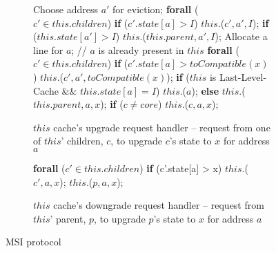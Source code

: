 \begin{figure}
\small

\begin{subfigure}{\linewidth}
\begin{boxedminipage}{\linewidth}
\begin{algorithmic}
        \State Choose address $a'$ for eviction;
        \State \textbf{forall} ($c' \in this.children$)
        \State \;\;\;\; \textbf{if} ($c'.state[a] > I$)
        \State \;\;\;\;\;\;\;\; \call{} $this.$\dReqL($c', a', I$);
        \State \textbf{if} ($this.state[a'] > I$)
        \State \;\;\;\; \call{} $this.$\dResp{}($this.parent, a', I$);
      \EndIf
      \State Allocate a line for $a$;
    \EndIf
    \State // $a$ is already present in $this$
    \State \textbf{forall} ($c' \in this.children$)
    \State \;\;\;\; \textbf{if} ($c'.state[a] > toCompatible(x)$)
    \State \;\;\;\;\;\;\;\; \call{} $this.$\dReqL($c', a', toCompatible(x)$);
    \State \textbf{if} ($this$ is Last-Level-Cache \&\& $this.state[a] = I$)
    \State \;\;\;\; \call{} $this$.\sendMem{}($a$);
    \State \textbf{else}
    \State \;\;\;\; \call{} $this.$\uReqL{}($this.parent, a, x$);
  \State \textbf{if} ($c \neq core$)
  \State \;\;\;\; \call{} $this$.\uResp{}($c, a, x$);
\EndProc
\end{algorithmic}
\end{boxedminipage}
\caption{$this$ cache's upgrade request handler -- request from one of $this$' children, $c$, to upgrade $c$'s state to $x$ for address $a$ }
\label{atomicUReq1}
\end{subfigure}

\begin{subfigure}{\linewidth}
\begin{boxedminipage}{\linewidth}
\begin{algorithmic}
    \State \textbf{forall} ($c' \in this.children$)
    \State \;\;\;\; \textbf{if} (c'.state[a] > x)
    \State \;\;\;\;\;\;\;\; \call{} $this.$\dReqL($c', a, x$);
    \State \call{} $this.$\dResp($p, a, x$);
  \EndIf
\EndProc
\end{algorithmic}
\end{boxedminipage}
\caption{$this$ cache's downgrade request handler -- request from $this$'
parent, $p$, to upgrade $p$'s state to $x$ for address $a$ }
\label{atomicDReq1}
\end{subfigure}

\caption{MSI protocol}
\label{msi-template}
\end{figure}

